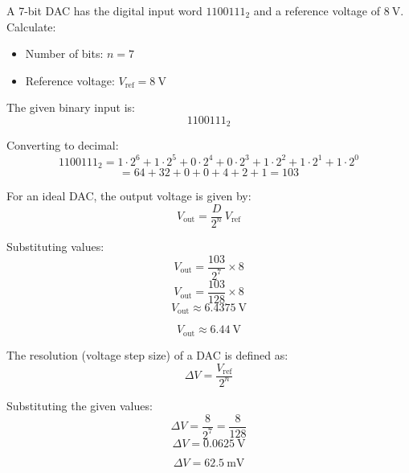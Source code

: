 


A 7-bit DAC has the digital input word $1100111_2$ and a reference voltage of $8 \ \text{V}$.\\

Calculate:


\begin{solutionblock}

\begin{itemize}
    \item Number of bits: $n = 7$
    \item Reference voltage: $V_{\text{ref}} = 8 \ \text{V}$
\end{itemize}

The given binary input is:
\[
1100111_2
\]

Converting to decimal:
\[
1100111_2 = 1\cdot2^6 + 1\cdot2^5 + 0\cdot2^4 + 0\cdot2^3 + 1\cdot2^2 + 1\cdot2^1 + 1\cdot2^0
\]
\[
= 64 + 32 + 0 + 0 + 4 + 2 + 1 = 103
\]

For an ideal DAC, the output voltage is given by:
\[
V_{\text{out}} = \frac{D}{2^n} \, V_{\text{ref}}
\]

Substituting values:
\[
V_{\text{out}} = \frac{103}{2^7} \times 8
\]
\[
V_{\text{out}} = \frac{103}{128} \times 8
\]
\[
V_{\text{out}} \approx 6.4375 \ \text{V}
\]

\[
\boxed{V_{\text{out}} \approx 6.44 \ \text{V}}
\]

\end{solutionblock}


\begin{solutionblock}

The resolution (voltage step size) of a DAC is defined as:
\[
\Delta V = \frac{V_{\text{ref}}}{2^n}
\]

Substituting the given values:
\[
\Delta V = \frac{8}{2^7} = \frac{8}{128}
\]
\[
\Delta V = 0.0625 \ \text{V}
\]

\[
\boxed{\Delta V = 62.5 \ \text{mV}}
\]

\end{solutionblock}

